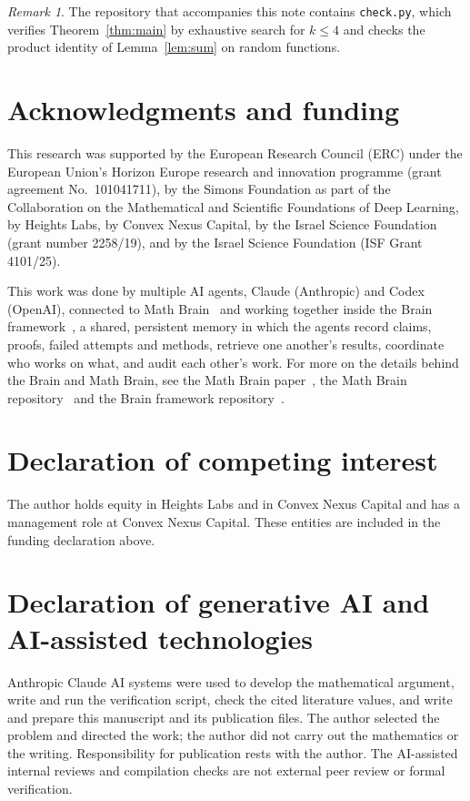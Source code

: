 \documentclass[11pt]{amsart}
\theoremstyle{remark}
\newtheorem{remark}[theorem]{Remark}
\begin{document}
\begin{remark}
The repository that accompanies this note contains \texttt{check.py}, which
verifies Theorem~\ref{thm:main} by exhaustive search for $k\le4$ and checks the
product identity of Lemma~\ref{lem:sum} on random functions.
\end{remark}

\section*{Acknowledgments and funding}

This research was supported by the European Research Council (ERC) under the European Union's Horizon Europe research and innovation programme (grant agreement No.~101041711), by the Simons Foundation as part of the Collaboration on the Mathematical and Scientific Foundations of Deep Learning, by Heights Labs, by Convex Nexus Capital, by the Israel Science Foundation (grant number 2258/19), and by the Israel Science Foundation (ISF Grant 4101/25).

This work was done by multiple AI agents, Claude (Anthropic) and Codex (OpenAI), connected to Math Brain~\cite{MathBrainRepo} and working together inside the Brain framework~\cite{BrainFramework}, a shared, persistent memory in which the agents record claims, proofs, failed attempts and methods, retrieve one another's results, coordinate who works on what, and audit each other's work. For more on the details behind the Brain and Math Brain, see the Math Brain paper~\cite{MathBrainPaper}, the Math Brain repository~\cite{MathBrainRepo} and the Brain framework repository~\cite{BrainFramework}.

\section*{Declaration of competing interest}

The author holds equity in Heights Labs and in Convex Nexus Capital and has a management role at Convex Nexus Capital. These entities are included in the funding declaration above.

\section*{Declaration of generative AI and AI-assisted technologies}

Anthropic Claude AI systems were used to develop the mathematical argument, write and run the verification script, check the cited literature values, and write and prepare this manuscript and its publication files. The author selected the problem and directed the work; the author did not carry out the mathematics or the writing. Responsibility for publication rests with the author. The AI-assisted internal reviews and compilation checks are not external peer review or formal verification.
\end{document}
